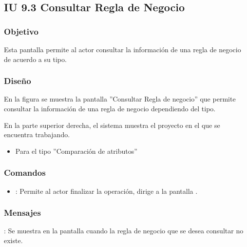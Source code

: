 \subsection{IU 9.3 Consultar Regla de Negocio}

\subsubsection{Objetivo}
	Esta pantalla permite al actor consultar la información de una regla de negocio de acuerdo a su tipo.
\subsubsection{Diseño}
	En la figura  se muestra la pantalla ''Consultar Regla de negocio'' que permite consultar la información de una regla de negocio dependiendo del tipo.
	
	
	En la parte superior derecha, el sistema muestra el proyecto en el que se encuentra trabajando.
	\begin{itemize}
		\item Para el tipo ''Comparación de atributos''
	\end{itemize}
\subsubsection{Comandos}
\begin{itemize}
	\item {}: Permite al actor finalizar la operación, dirige a la pantalla .
\end{itemize}

\subsubsection{Mensajes}

\begin{Citemize}
	\item {}: Se muestra en la pantalla  cuando la regla de negocio que se desea consultar no existe.
\end{Citemize}
